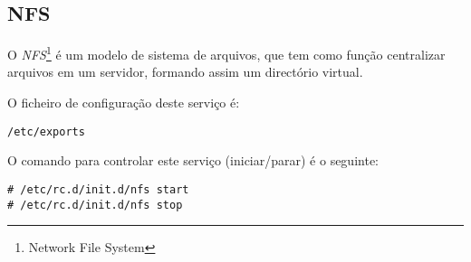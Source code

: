 \subsection{NFS}

O \emph{NFS}\footnote{Network File System} é um modelo de sistema de arquivos, que tem como função centralizar arquivos em um servidor, formando assim um directório virtual.

O ficheiro de configuração deste serviço é:

\begin{Verbatim}[commandchars=\\\{\}]
/etc/exports
\end{Verbatim}

O comando para controlar este serviço (iniciar/parar) é o seguinte:

\begin{Verbatim}[commandchars=\\\{\}]
# /etc/rc.d/init.d/nfs start
# /etc/rc.d/init.d/nfs stop
\end{Verbatim}

